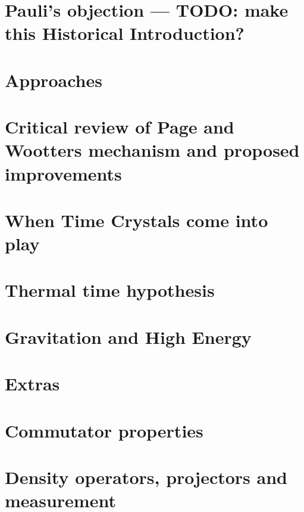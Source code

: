\documentclass{book}
\begin{document}
\chapter{Pauli's objection --- TODO: make this Historical Introduction?}



\chapter{Approaches}


\chapter{Critical review of Page and Wootters mechanism and proposed improvements}



\chapter{When Time Crystals come into play}


\chapter{Thermal time hypothesis}


\chapter{Gravitation and High Energy}



\chapter{Extras}


\appendix
\chapter{Commutator properties}

\chapter{Density operators, projectors and measurement}


\printbibliography[title=References]
\end{document}
